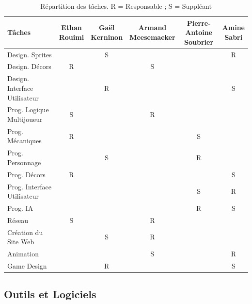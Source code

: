 \documentclass{report}
\begin{document}
\begin{table}[h!]
    \centering
    \renewcommand{\arraystretch}{1.5} %
    \setlength{\tabcolsep}{8pt} %
    \begin{tabular}{|p{4.5cm}|c|c|c|c|c|}
        \hline
        \rowcolor{darkgray} \color{white} \textbf{Tâches} & \color{white} \makecell{\textbf{Ethan} \\ \textbf{Rouimi}} & \color{white} \makecell{\textbf{Gaël} \\ \textbf{Kerninon}} & \color{white} \makecell{\textbf{Armand} \\ \textbf{Meesemaeker}} & \color{white} \makecell{\textbf{Pierre-Antoine} \\ \textbf{Soubrier}} & \color{white} \makecell{\textbf{Amine} \\ \textbf{Sabri}} \\ \hline


        Design. Sprites & & S & & & R \\ \hline
        Design. Décors & R & & S & &  \\ \hline
        Design. Interface Utilisateur & & R & & & S \\ \hline
        Prog. Logique Multijoueur & S &  &R & & \\ \hline
        Prog. Mécaniques & R & & & S & \\ \hline
        Prog. Personnage & & S & &R & \\ \hline
        Prog. Décors & R & & & & S \\ \hline
        Prog. Interface Utilisateur & & & & S & R\\ \hline
        Prog. IA & & &  & R& S \\ \hline
        Réseau & S & &R & & \\ \hline
        Création du Site Web & & S &R & & \\ \hline
        Animation & & &S & & R\\ \hline
        Game Design & & R& & & S \\ \hline

    \end{tabular}
    \caption{Répartition des tâches. R = Responsable ; S = Suppléant}
    \label{tab:repartition_taches}
\end{table}


\newpage



\subsection{Outils et Logiciels}
\end{document}
